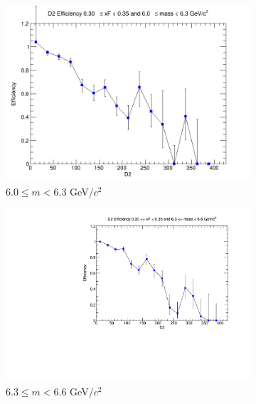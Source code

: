 \documentclass[11pt]{article}
\begin{document}
\begin{figure}[p]
\begin{subfigure}[b]{0.32\textwidth}
        \includegraphics[width=\textwidth]{./kTrackerEfficiencyPlots/D2_Efficiency_xF6_mass6.png}
        \caption{$6.0 \leq m < 6.3$ GeV/$c^2$}
    \end{subfigure}\hfill
    \begin{subfigure}[b]{0.32\textwidth}
        \centering
        \includegraphics[width=\textwidth]{./kTrackerEfficiencyPlots/D2_Efficiency_xF6_mass7.pdf}
        \caption{$6.3 \leq m < 6.6$ GeV/$c^2$}
    \end{subfigure}\hfill
    \begin{subfigure}[b]{0.32\textwidth}
        \centering

\end{subfigure}
\end{figure}
\end{document}
